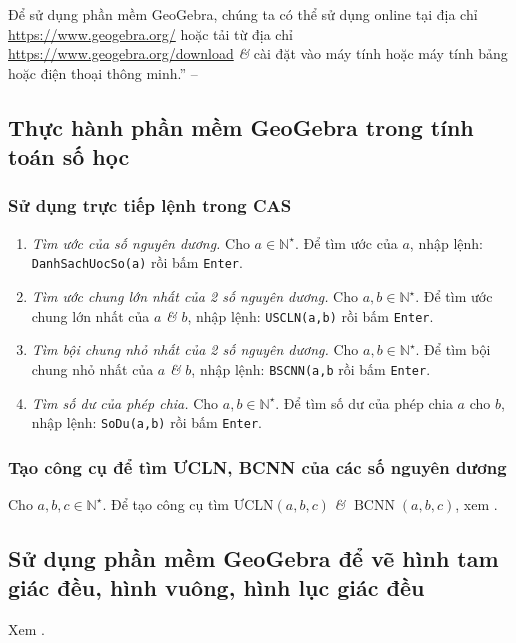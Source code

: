 \documentclass[oneside]{book}
\numberwithin{equation}{section}
\begin{document}
Để sử dụng phần mềm GeoGebra, chúng ta có thể sử dụng online tại địa chỉ \url{https://www.geogebra.org/} hoặc tải từ địa chỉ \url{https://www.geogebra.org/download} \textit{\&} cài đặt vào máy tính hoặc máy tính bảng hoặc điện thoại thông minh.'' -- \cite[p. 119]{Thai_Anh_Dat_Ha_Loan_Nam_Quang_Toan_6_tap_1}

\subsection{Thực hành phần mềm GeoGebra trong tính toán số học}

\subsubsection{Sử dụng trực tiếp lệnh trong CAS}
\begin{enumerate}
	\item \textit{Tìm ước của số nguyên dương.} Cho $a\in\mathbb{N}^\star$. Để tìm ước của $a$, nhập lệnh: \texttt{DanhSachUocSo(a)} rồi bấm \texttt{Enter}.
	\item \textit{Tìm ước chung lớn nhất của 2 số nguyên dương.} Cho $a,b\in\mathbb{N}^\star$. Để tìm ước chung lớn nhất của $a$ \textit{\&} $b$, nhập lệnh: \texttt{USCLN(a,b)} rồi bấm \texttt{Enter}.
	\item \textit{Tìm bội chung nhỏ nhất của 2 số nguyên dương.} Cho $a,b\in\mathbb{N}^\star$. Để tìm bội chung nhỏ nhất của $a$ \textit{\&} $b$, nhập lệnh: \texttt{BSCNN(a,b} rồi bấm \texttt{Enter}.
	\item \textit{Tìm số dư của phép chia.} Cho $a,b\in\mathbb{N}^\star$. Để tìm số dư của phép chia $a$ cho $b$, nhập lệnh: \texttt{SoDu(a,b)} rồi bấm \texttt{Enter}.
\end{enumerate}

\subsubsection{Tạo công cụ để tìm ƯCLN, BCNN của các số nguyên dương}
Cho $a,b,c\in\mathbb{N}^\star$. Để tạo công cụ tìm $\mbox{ƯCLN}(a,b,c)$ \textit{\&} $\operatorname{BCNN}(a,b,c)$, xem \cite[pp. 120--121]{Thai_Anh_Dat_Ha_Loan_Nam_Quang_Toan_6_tap_1}.

\subsection{Sử dụng phần mềm GeoGebra để vẽ hình tam giác đều, hình vuông, hình lục giác đều}
Xem \cite[pp. 122--124]{Thai_Anh_Dat_Ha_Loan_Nam_Quang_Toan_6_tap_1}.
\end{document}
